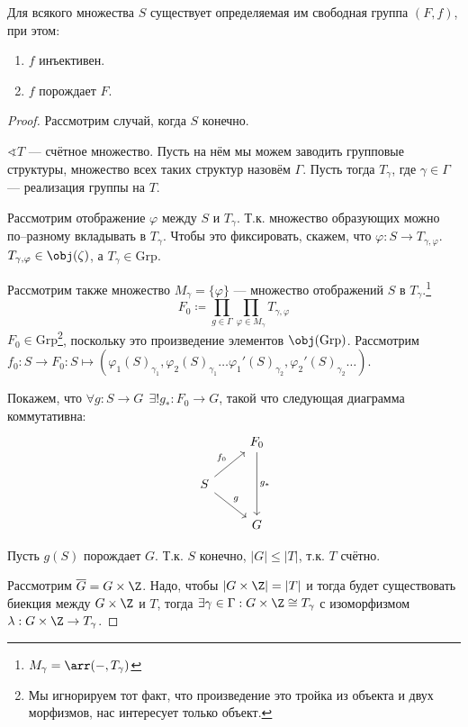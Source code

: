 \begin{theorem}
    Для всякого множества \(S\) существует определяемая им свободная группа \((F, f)\), при этом:
    \begin{enumerate}
        \item \(f\) инъективен.
        \item \(f\) порождает \(F\).
    \end{enumerate}
\end{theorem}
\begin{proof}
    Рассмотрим случай, когда \(S\) конечно.

    \(\sphericalangle T\) --- счётное множество. Пусть на нём мы можем заводить групповые структуры, множество всех таких структур назовём \(\Gamma\). Пусть тогда \(T_\gamma\), где \(\gamma \in \Gamma\) --- реализация группы на \(T\).

    Рассмотрим отображение \(\varphi\) между \(S\) и \(T_\gamma\). Т.к. множество образующих можно по--разному вкладывать в \(T_\gamma\). Чтобы это фиксировать, скажем, что \(\varphi : S \to T_{\gamma, \varphi}\). \(T_{\gamma, \varphi} \in \obj(\zeta)\), а \(T_\gamma \in \mathrm{Grp}\).

    Рассмотрим также множество \(M_\gamma = \{\varphi\}\) --- множество отображений \(S\) в \(T_\gamma\).\footnote{\(M_\gamma = \arr( - , T_\gamma)\)}
    \[F_0 \coloneqq \prod_{g \in \Gamma} \prod_{\varphi \in M_\gamma} T_{\gamma, \varphi}\]
    \(F_0 \in \mathrm{Grp}\)\footnote{Мы игнорируем тот факт, что произведение это тройка из объекта и двух морфизмов, нас интересует только объект.}, поскольку это произведение элементов \(\obj(\mathrm{Grp})\). Рассмотрим \(f_0 : S \to F_0 : S \mapsto (\varphi_1(S)_{\gamma_1}, \varphi_2(S)_{\gamma_1} \dots \varphi_1'(S)_{\gamma_2}, \varphi_2'(S)_{\gamma_2} \dots)\).

    Покажем, что \(\forall g : S \to G \ \ \exists! g_* : F_0 \to G\), такой что следующая диаграмма коммутативна:
    \[\begin{tikzcd}
            & F_0 \arrow{dd}{g_*} \\
            S \arrow{ur}{f_0} \arrow{dr}{g} \\
            & G
        \end{tikzcd}\]

    Пусть \(g(S)\) порождает \(G\). Т.к. \(S\) конечно, \(|G| \leq |T|\), т.к. \(T\) счётно.

    Рассмотрим \(\overline{G} = G \times \Z\). Надо, чтобы \(|G \times \Z| = |T|\) и тогда будет существовать биекция между \(G \times \Z\) и \(T\), тогда \(\exists \gamma \in \Gamma : G \times \Z \cong T_\gamma\) с изоморфизмом \(\lambda : G \times \Z \to T_\gamma\).


\end{proof}
